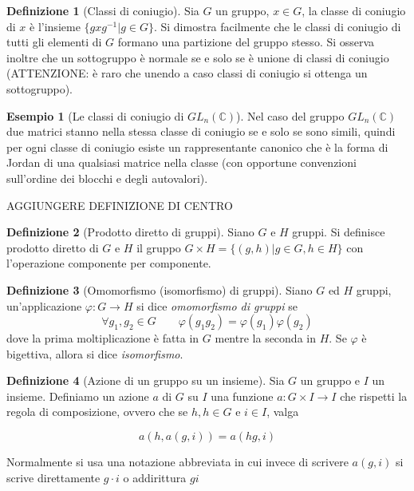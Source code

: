 \documentclass[11pt]{article}
\theoremstyle{plain}
\theoremstyle{definition}
\newtheorem{defn}{Definizione}[section]
\newtheorem{exmp}{Esempio}[section]
\theoremstyle{remark}
\newcommand{\C}{\mathbb{C}}
\begin{document}
\begin{defn}[Classi di coniugio]
Sia $G$ un gruppo, $x \in G$, la classe di coniugio di $x$ è l'insieme $\{ gxg^{-1} | g\in G \}$. Si dimostra facilmente che le classi di coniugio di tutti gli elementi di $G$ formano una partizione del gruppo stesso. Si osserva inoltre che un sottogruppo è normale se e solo se è unione di classi di coniugio (ATTENZIONE: è raro che unendo a caso classi di coniugio si ottenga un sottogruppo).
\end{defn}


\begin{exmp}[Le classi di coniugio di $GL_n(\C)$]
Nel caso del gruppo $GL_n(\C)$ due matrici stanno nella stessa classe di coniugio se e solo se sono simili, quindi per ogni classe di coniugio esiste un rappresentante canonico che è la forma di Jordan di una qualsiasi matrice nella classe (con opportune convenzioni sull'ordine dei blocchi e degli autovalori).
\end{exmp}

AGGIUNGERE DEFINIZIONE DI CENTRO

\begin{defn}[Prodotto diretto di gruppi]
Siano $G$ e $H$ gruppi. Si definisce prodotto diretto di $G$ e $H$ il gruppo $G \times H = \{ (g, h) | g \in G, h \in H\}$ con l'operazione componente per componente.
\end{defn}


\begin{defn}[Omomorfismo (isomorfismo) di gruppi]
Siano $G$ ed $H$ gruppi, un'applicazione $\varphi:G\to H$ si dice \textit{omomorfismo di gruppi} se
\[
	\forall g_1,g_2\in G\qquad \varphi(g_1 g_2)=\varphi(g_1)\varphi(g_2)
\]
dove la prima moltiplicazione è fatta in $G$ mentre la seconda in $H$.
Se $\varphi$ è bigettiva, allora si dice \textit{isomorfismo}.
\end{defn}


\begin{defn}[Azione di un gruppo su un insieme] Sia $G$ un gruppo e $I$ un insieme. Definiamo un azione $a$ di $G$ su $I$ una funzione $a:G\times I \to I$ che rispetti la regola di composizione, ovvero che se $h,h\in G$ e $i \in I$, valga

\[ a(h,a(g,i)) = a(hg, i) \]

Normalmente si usa una notazione abbreviata in cui invece di scrivere $a(g,i)$ si scrive direttamente $g\cdot i$ o addirittura $gi$


\label{defn:azione}
\end{defn}
\end{document}
